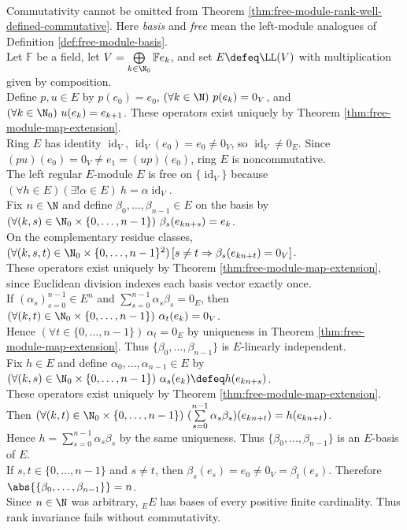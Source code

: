 \begin{counterexample} \label{cex:noncommutative-rank-failure-endomorphism-ring} \\
Commutativity cannot be omitted from Theorem \ref{thm:free-module-rank-well-defined-commutative}. Here \emph{basis} and \emph{free} mean the left-module analogues of Definition \ref{def:free-module-basis}.\\
Let $\mathbb{F}$ be a field, let $V=\bigoplus\limits_{k\in\N_0}\mathbb{F}e_k$, and set $E\defeq\LL(V)$ with multiplication given by composition.\\
Define $p,u\in E$ by $p(e_0)=e_0$, $(\forall k\in\N)\ p(e_k)=0_V$, and $(\forall k\in\N_0)\ u(e_k)=e_{k+1}$. These operators exist uniquely by Theorem \ref{thm:free-module-map-extension}.\\
Ring $E$ has identity $\operatorname{id}_V$, $\operatorname{id}_V(e_0)=e_0\neq0_V$, so $\operatorname{id}_V\neq0_E$. Since $(pu)(e_0)=0_V\neq e_1=(up)(e_0)$, ring $E$ is noncommutative.\\
The left regular $E$-module $E$ is free on $\{\operatorname{id}_V\}$ because $(\forall h\in E)(\exists!\alpha\in E)\ h=\alpha\operatorname{id}_V$.\\
Fix $n\in\N$ and define $\beta_0,\ldots,\beta_{n-1}\in E$ on the basis by $(\forall(k,s)\in\N_0\times\{0,\ldots,n-1\})\ \beta_s(e_{kn+s})=e_k$.\\
On the complementary residue classes, $(\forall(k,s,t)\in\N_0\times\{0,\ldots,n-1\}^2)\,[s\neq t\Rightarrow\beta_s(e_{kn+t})=0_V]$.\\
These operators exist uniquely by Theorem \ref{thm:free-module-map-extension}, since Euclidean division indexes each basis vector exactly once.\\
If $(\alpha_s)_{s=0}^{n-1}\in E^n$ and $\sum\limits_{s=0}^{n-1}\alpha_s\beta_s=0_E$, then $(\forall(k,t)\in\N_0\times\{0,\ldots,n-1\})\ \alpha_t(e_k)=0_V$.\\
Hence $(\forall t\in\{0,\ldots,n-1\})\ \alpha_t=0_E$ by uniqueness in Theorem \ref{thm:free-module-map-extension}. Thus $\{\beta_0,\ldots,\beta_{n-1}\}$ is $E$-linearly independent.\\
Fix $h\in E$ and define $\alpha_0,\ldots,\alpha_{n-1}\in E$ by $(\forall(k,s)\in\N_0\times\{0,\ldots,n-1\})\ \alpha_s(e_k)\defeq h(e_{kn+s})$.\\
These operators exist uniquely by Theorem \ref{thm:free-module-map-extension}. Then $(\forall(k,t)\in\N_0\times\{0,\ldots,n-1\})\ (\sum\limits_{s=0}^{n-1}\alpha_s\beta_s)(e_{kn+t})=h(e_{kn+t})$.\\
Hence $h=\sum\limits_{s=0}^{n-1}\alpha_s\beta_s$ by the same uniqueness. Thus $\{\beta_0,\ldots,\beta_{n-1}\}$ is an $E$-basis of $E$.\\
If $s,t\in\{0,\ldots,n-1\}$ and $s\neq t$, then $\beta_s(e_s)=e_0\neq0_V=\beta_t(e_s)$. Therefore $\abs{\{\beta_0,\ldots,\beta_{n-1}\}}=n$.\\
Since $n\in\N$ was arbitrary, ${}_E E$ has bases of every positive finite cardinality. Thus rank invariance fails without commutativity.
\end{counterexample}

